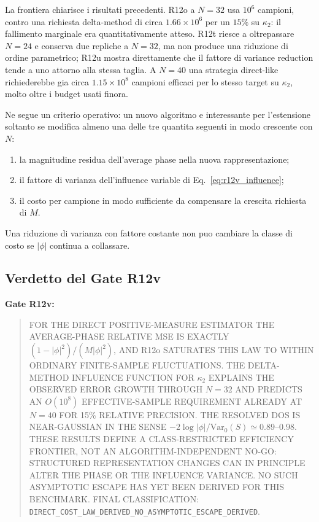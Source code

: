 \documentclass[11pt,a4paper]{article}
\newcommand{\status}[1]{\textsf{#1}}
\begin{document}
La frontiera chiarisce i risultati precedenti. R12o a $N=32$ usa $10^6$ campioni, contro una richiesta delta-method di circa $1.66\times10^6$ per un $15\%$ su $\kappa_2$: il fallimento marginale era quantitativamente atteso. R12t riesce a oltrepassare $N=24$ e conserva due repliche a $N=32$, ma non produce una riduzione di ordine parametrico; R12u mostra direttamente che il fattore di variance reduction tende a uno attorno alla stessa taglia. A $N=40$ una strategia direct-like richiederebbe gia circa $1.15\times10^8$ campioni efficaci per lo stesso target su $\kappa_2$, molto oltre i budget usati finora.

Ne segue un criterio operativo: un nuovo algoritmo e interessante per l'estensione soltanto se modifica almeno una delle tre quantita seguenti in modo crescente con $N$:
\begin{enumerate}
\item la magnitudine residua dell'average phase nella nuova rappresentazione;
\item il fattore di varianza dell'influence variable di Eq.~\eqref{eq:r12v_influence};
\item il costo per campione in modo sufficiente da compensare la crescita richiesta di $M$.
\end{enumerate}
Una riduzione di varianza con fattore costante non puo cambiare la classe di costo se $|\phi|$ continua a collassare.

\subsection{Verdetto del Gate R12v}

\textbf{Gate R12v:}
\begin{quote}
\status{FOR THE DIRECT POSITIVE-MEASURE ESTIMATOR THE AVERAGE-PHASE RELATIVE MSE IS EXACTLY $(1-|\phi|^2)/(M|\phi|^2)$, AND R12o SATURATES THIS LAW TO WITHIN ORDINARY FINITE-SAMPLE FLUCTUATIONS. THE DELTA-METHOD INFLUENCE FUNCTION FOR $\kappa_2$ EXPLAINS THE OBSERVED ERROR GROWTH THROUGH $N=32$ AND PREDICTS AN $O(10^8)$ EFFECTIVE-SAMPLE REQUIREMENT ALREADY AT $N=40$ FOR 15\% RELATIVE PRECISION. THE RESOLVED DOS IS NEAR-GAUSSIAN IN THE SENSE $-2\log|\phi|/\mathrm{Var}_0(S)\simeq0.89$--$0.98$. THESE RESULTS DEFINE A CLASS-RESTRICTED EFFICIENCY FRONTIER, NOT AN ALGORITHM-INDEPENDENT NO-GO: STRUCTURED REPRESENTATION CHANGES CAN IN PRINCIPLE ALTER THE PHASE OR THE INFLUENCE VARIANCE. NO SUCH ASYMPTOTIC ESCAPE HAS YET BEEN DERIVED FOR THIS BENCHMARK. FINAL CLASSIFICATION:} \texttt{DIRECT\_COST\_LAW\_DERIVED\_NO\_ASYMPTOTIC\_ESCAPE\_DERIVED}.
\end{quote}
\end{document}
